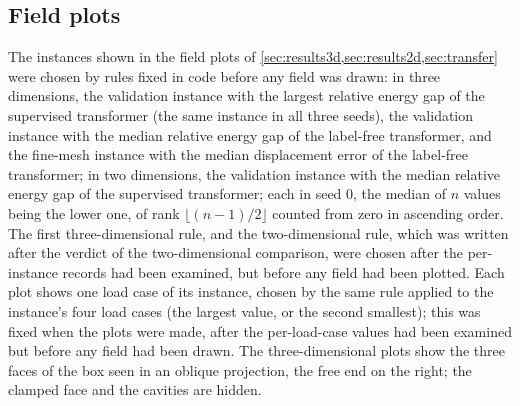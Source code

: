 \subsection{Field plots}\label{app:repro:plots}

The instances shown in the field plots of \cref{sec:results3d,sec:results2d,sec:transfer}
were chosen by rules fixed in code before any field was drawn: in three dimensions, the
validation instance with the largest relative energy gap of the supervised transformer (the
same instance in all three seeds), the validation instance with the median relative energy
gap of the label-free transformer, and the fine-mesh instance with the median displacement
error of the label-free transformer; in two dimensions, the validation instance with the
median relative energy gap of the supervised transformer; each in seed 0, the median of $n$
values being the lower one, of rank $\lfloor(n-1)/2\rfloor$ counted from zero in ascending
order. The first three-dimensional rule, and the two-dimensional rule, which was written
after the verdict of the two-dimensional comparison, were chosen after the per-instance
records had been examined, but before any field had been plotted. Each plot shows one load
case of its instance, chosen by the same rule applied to the instance's four load cases (the
largest value, or the second smallest); this was fixed when the plots were made, after the
per-load-case values had been examined but before any field had been drawn. The
three-dimensional plots show the three faces of the box seen in an oblique projection, the
free end on the right; the clamped face and the cavities are hidden.
